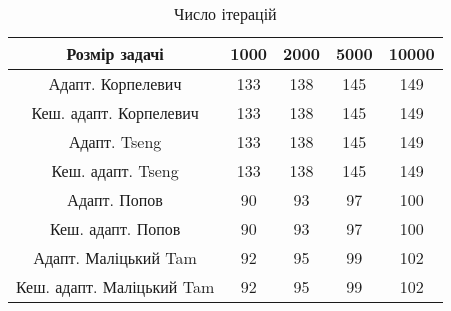 \begin{table}[H]
	\centering
	\begin{tabular}{|c||c|c|c|c|}\hline
		Розмір задачі & 1000 & 2000 & 5000 & 10000 \\ \hline \hline
		Адапт. Корпелевич & 133 & 138 & 145 & 149 \\ \hline
		Кеш. адапт. Корпелевич & 133 & 138 & 145 & 149 \\ \hline
		Адапт. Tseng & 133 & 138 & 145 & 149 \\ \hline
		Кеш. адапт. Tseng & 133 & 138 & 145 & 149 \\ \hline
		Адапт. Попов & 90 & 93 & 97 & 100 \\ \hline
		Кеш. адапт. Попов & 90 & 93 & 97 & 100 \\ \hline
		Адапт. Маліцький Tam & 92 & 95 & 99 & 102 \\ \hline
		Кеш. адапт. Маліцький Tam & 92 & 95 & 99 & 102 \\ \hline
	\end{tabular}
	\caption{Число ітерацій}
\end{table}

